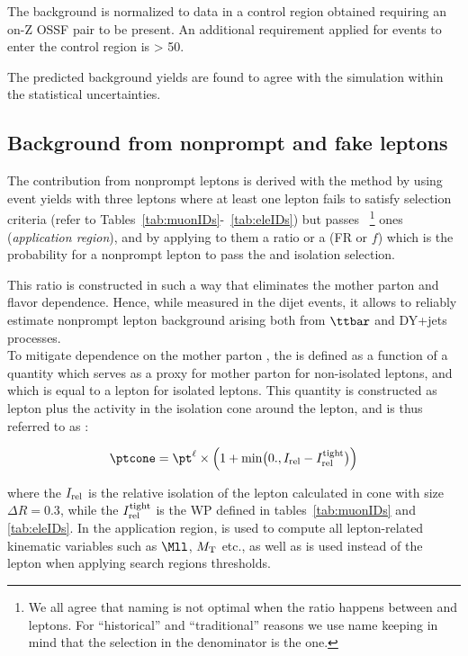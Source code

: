 The \WZ background is normalized to data in a control region obtained 
requiring an on-Z OSSF pair to be present. An additional requirement applied 
for events to enter the control region is \ptmiss > 50\GeV.

The predicted background yields are found to agree with the simulation
within the statistical uncertainties. 


\subsection{Background from nonprompt and fake leptons}\label{sec:tight_loose_method}

The contribution from nonprompt leptons is derived with the \ttol method
by using event yields with three leptons where at least one lepton fails to satisfy \ti 
selection criteria (refer to
Tables~\ref{tab:muonIDs}-~\ref{tab:eleIDs}) but passes
\fo~\footnote{We all agree that \ttol naming is not optimal when the
  ratio happens between \ti and \fo leptons. For ``historical'' and ``traditional''
  reasons we use \ttol name keeping in mind that the selection in the
  denominator is the \fo one.}
ones (\emph{application region}), 
and by applying to them a \ttol ratio or a \fr (FR
or $f$) which is the probability for 
a nonprompt lepton to pass the \ti and isolation selection.

This ratio is constructed in such a way that eliminates the mother parton \pt and flavor dependence.
Hence, while measured in the dijet events, it allows to reliably estimate nonprompt lepton background
arising both from $\ttbar$ and DY+jets processes. \\
To mitigate \fr dependence on the mother parton \pt, the \fr is defined as a function
of a quantity which serves as a proxy for mother parton \pt for non-isolated leptons, and which
is equal to a lepton \pt for isolated leptons. This quantity is
constructed as lepton \pt plus 
the activity in the isolation cone around the lepton, and is thus referred to as \ptcone:

\begin{equation}
\ptcone = \pt^\ell\times\Bigl(1+ \min\bigl(0., \Irel - \Irel^\text{tight}\bigr) \Bigr)
\end{equation}

\noindent where the $I_{\mathrm{rel}}$ is the relative isolation of the lepton calculated in cone with size $\Delta R=0.3$, while the $I_{\mathrm{rel}}^\text{tight}$ is the \ti  WP defined in tables~\ref{tab:muonIDs} and \ref{tab:eleIDs}.
In the application region, \ptcone is used to compute all lepton-related kinematic variables
such as $\Mll$, $M_{\mathrm{T}}$ etc., as well as is used instead of the lepton \pt when applying 
search regions \pt thresholds.

